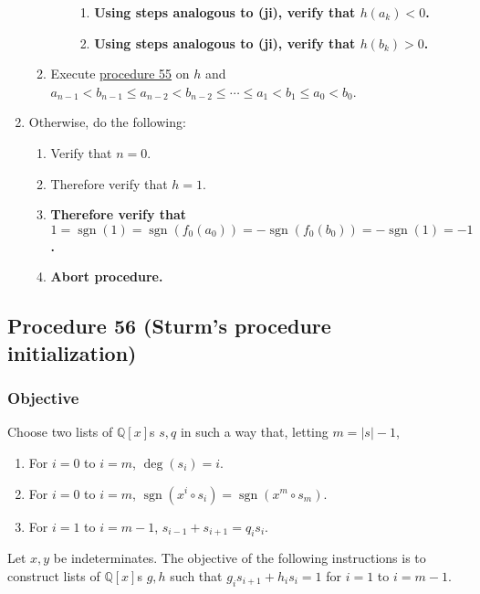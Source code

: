 \documentclass[twocolumn]{article}
\DeclareMathOperator{\sgn}{sgn}
\begin{document}
\begin{enumerate}
\begin{enumerate}
\begin{enumerate}
							\begin{enumerate}
								\item \textbf{Using steps analogous to (ji), verify that $h(a_k)<0$.}
								\item \textbf{Using steps analogous to (ji), verify that $h(b_k)>0$.}
							\end{enumerate}
						\end{enumerate}
						\item Execute \hyperref[sec:procedure 55]{procedure 55} on $h$ and $a_{n-1}<b_{n-1}\le a_{n-2}<b_{n-2}\le\cdots\le a_1<b_1\le a_0<b_0$.
					\end{enumerate}
					\item Otherwise, do the following:
					\begin{enumerate}
						\item Verify that $n=0$.
						\item Therefore verify that $h=1$.
						\item \textbf{Therefore verify that $1=\sgn(1)=\sgn(f_0(a_0))=-\sgn(f_0(b_0))=-\sgn(1)=-1$.}
						\item \textbf{Abort procedure.}
					\end{enumerate}
				\end{enumerate}
		\subsection{Procedure 56 (Sturm's procedure initialization)}\label{sec:procedure 56}
			\subsubsection{Objective}
				Choose two lists of $\mathbb{Q}[x]$s $s,q$ in such a way that, letting $m=\lvert s\rvert-1$,
				\begin{enumerate}
					\item For $i=0$ to $i=m$, $\deg(s_i)=i$.
					\item For $i=0$ to $i=m$, $\sgn(x^i\circ s_i)=\sgn(x^m\circ s_m)$.
					\item For $i=1$ to $i=m-1$, $s_{i-1}+s_{i+1}=q_is_i$.
				\end{enumerate}
				Let $x,y$ be indeterminates. The objective of the following instructions is to construct lists of $\mathbb{Q}[x]$s $g,h$ such that $g_is_{i+1}+h_is_i=1$ for $i=1$ to $i=m-1$.
\end{document}
